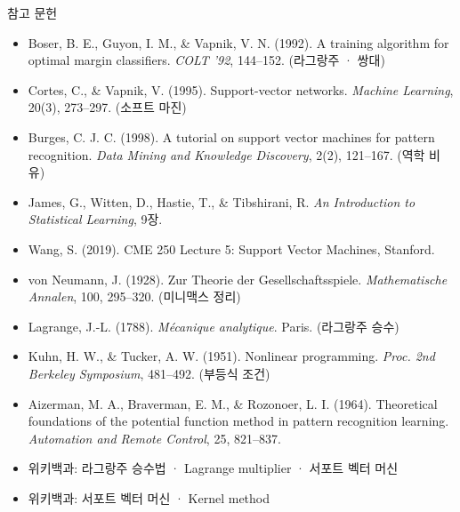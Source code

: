 \documentclass[aspectratio=169,11pt,t]{beamer}
\newcommand{\paperlink}[1]{\href{#1}{\textcolor{ksablue}{\faLink}}}
\begin{document}
\begin{frame}{참고 문헌}
\vfill
\scriptsize
\begin{itemize}
\setlength{\itemsep}{0.25em}
\item Boser, B. E., Guyon, I. M., \& Vapnik, V. N. (1992). A training algorithm for optimal margin classifiers. \textit{COLT '92}, 144--152. \;(라그랑주 · 쌍대) \paperlink{https://doi.org/10.1145/130385.130401}
\item Cortes, C., \& Vapnik, V. (1995). Support-vector networks. \textit{Machine Learning}, 20(3), 273--297. \;(소프트 마진) \paperlink{https://doi.org/10.1007/BF00994018}
\item Burges, C. J. C. (1998). A tutorial on support vector machines for pattern recognition. \textit{Data Mining and Knowledge Discovery}, 2(2), 121--167. \;(역학 비유) \paperlink{https://doi.org/10.1023/A:1009715923555}
\item James, G., Witten, D., Hastie, T., \& Tibshirani, R. \textit{An Introduction to Statistical Learning}, 9장. \paperlink{https://doi.org/10.1007/978-1-0716-1418-1}
\item Wang, S. (2019). CME 250 Lecture 5: Support Vector Machines, Stanford. \paperlink{https://web.stanford.edu/class/cme250/files/cme250_lecture5.pdf}
\item von Neumann, J. (1928). Zur Theorie der Gesellschaftsspiele. \textit{Mathematische Annalen}, 100, 295--320. \;(미니맥스 정리) \paperlink{https://doi.org/10.1007/BF01448847}
\item Lagrange, J.-L. (1788). \textit{Mécanique analytique}. Paris. \;(라그랑주 승수)
\item Kuhn, H. W., \& Tucker, A. W. (1951). Nonlinear programming. \textit{Proc. 2nd Berkeley Symposium}, 481--492. \;(부등식 조건) \paperlink{https://projecteuclid.org/euclid.bsmsp/1200500249}
\item Aizerman, M. A., Braverman, E. M., \& Rozonoer, L. I. (1964). Theoretical foundations of the potential function method in pattern recognition learning. \textit{Automation and Remote Control}, 25, 821--837.
\item 위키백과: 라그랑주 승수법 \paperlink{https://ko.wikipedia.org/wiki/\%EB\%9D\%BC\%EA\%B7\%B8\%EB\%9E\%91\%EC\%A3\%BC_\%EC\%8A\%B9\%EC\%88\%98\%EB\%B2\%95} \;·\; Lagrange multiplier \paperlink{https://en.wikipedia.org/wiki/Lagrange_multiplier} \;·\; 서포트 벡터 머신 \paperlink{https://ko.wikipedia.org/wiki/\%EC\%84\%9C\%ED\%8F\%AC\%ED\%8A\%B8_\%EB\%B2\%A1\%ED\%84\%B0_\%EB\%A8\%B8\%EC\%8B\%A0}
\item 위키백과: 서포트 벡터 머신 \paperlink{https://ko.wikipedia.org/wiki/\%EC\%84\%9C\%ED\%8F\%AC\%ED\%8A\%B8_\%EB\%B2\%A1\%ED\%84\%B0_\%EB\%A8\%B8\%EC\%8B\%A0} \;·\; Kernel method \paperlink{https://en.wikipedia.org/wiki/Kernel_method}
\end{itemize}
\vfill
{}
\end{frame}
\end{document}
